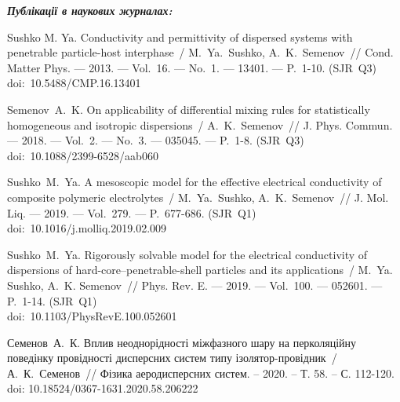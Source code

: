 
\textbf{\textit{Публікації в наукових журналах:}}
\begin{enumerate}[leftmargin=0.8cm, label={[}\arabic*$^\ast${]}]
	\item
	Sushko M. Ya. Conductivity and permittivity of dispersed systems 
	with penetr\-able particle-host interphase~/ M.~Ya.~Sushko, 
	A.~K.~Semenov~// Cond. Matter Phys. --- 2013. --- Vol.~16. --- No.~1. 
	--- 13401. --- P.~1-10. (SJR~Q3)\\ doi:~10.5488/CMP.16.13401
	
	\item
	Semenov~A.~K. On applicability of differential mixing rules for
	statistically homo\-geneous and isotropic dispersions~/ A.~K.~Semenov~//
	J. Phys. Commun. --- 2018. --- Vol.~2. --- No.~3. --- 035045. --- P.~1-8. (SJR~Q3)\\
	doi:~10.1088/2399-6528/aab060
	
	\item
	Sushko~M.~Ya. A mesoscopic model for the effective electrical 
	conductivity of composite polymeric electrolytes~/ M.~Ya.~Sushko,
	A.~K.~Se\-menov~// J. Mol. Liq. --- 2019. --- Vol.~279. --- P.~677-686.
	(SJR~Q1)\\ doi:~10.1016/j.molliq.2019.02.009
	
	\item
	Sushko~M.~Ya. Rigorously solvable model for the electrical conductivity of dispersions of hard-core--penetrable-shell particles and its applications~/
	M.~Ya. Su\-shko, A.~K. Semenov~//
	Phys. Rev. E. --- 2019. --- Vol.~100. --- 052601. --- P.~1-14. (SJR~Q1)\\
	doi:~10.1103/PhysRevE.100.052601
	
	\item Семенов~А.~К. Вплив неоднорідності міжфазного шару на перколяційну поведінку провідності дисперсних систем типу ізолятор-провідник~/ А.~К.~Семенов~// Фізика аеродисперсних систем. -- 2020. -- Т. 58. -- С. 112-120.\\
	doi: 10.18524/0367-1631.2020.58.206222
\end{enumerate}



